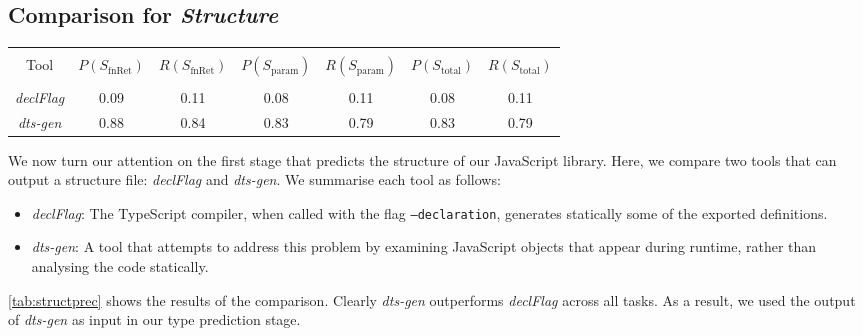 \documentclass[sigplan,10pt,anonymous]{acmart} %
\theoremstyle{plain}
\theoremstyle{remark}
\theoremstyle{definition}
\begin{document}
\subsection{Comparison for \textit{Structure}} \label{ssec:structure_comparison}

\begin{table*}[t]
  \centering
  \caption{Aggregate \textit{Structure} precision and recall across all modules.
    Our type universe consists of $78$ types, while we use 48 JavaScript libraries as input with 2012 identifiers in total.} \label{tab:structprec}
  \begin{tabular}{ccccccc}
    \toprule                                                                                                                                              \\
    Tool              & $P(S_\text{fnRet})$ & $R(S_\text{fnRet})$ & $P(S_\text{param})$ & $R(S_\text{param})$ & $P(S_\text{total})$ & $R(S_\text{total})$ \\
    \midrule                                                                                                                                              \\
    \textit{declFlag} & 0.09                & 0.11                & 0.08                & 0.11                & 0.08                & 0.11                \\
    \textit{dts-gen}  & 0.88                & 0.84                & 0.83                & 0.79                & 0.83                & 0.79                \\
    \bottomrule
  \end{tabular}
\end{table*}

We now turn our attention on the first stage that predicts the structure of our JavaScript library.
Here, we compare two tools that can output a structure file: \textit{declFlag} and \textit{dts-gen}.
We summarise each tool as follows:
\begin{itemize}[label={\tiny$\bullet$}]
  \item \textit{declFlag}: The TypeScript compiler, when called with the flag \texttt{--declaration}, generates statically some of the exported definitions.
  \item \textit{dts-gen}: A tool that attempts to address this problem by examining JavaScript objects that appear during runtime, rather than analysing the code statically.
\end{itemize}
\cref{tab:structprec} shows the results of the comparison.
Clearly \textit{dts-gen} outperforms \textit{declFlag} across all tasks.
As a result, we used the output of \textit{dts-gen} as input in our type prediction stage.
\end{document}
